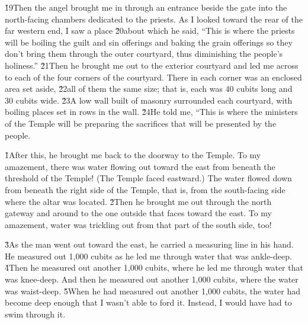\v{19}Then the angel brought me in through an entrance beside the gate into the north-facing chambers dedicated to the priests. As I looked toward the rear of the far western end, I saw a place \v{20}about which he said, ``This is where the priests will be boiling the guilt and sin offerings and baking the grain offerings so they don't bring them through the outer courtyard, thus diminishing the people's holiness.'' \v{21}Then he brought me out to the exterior courtyard and led me across to each of the four corners of the courtyard. There in each corner was an enclosed area set aside, \v{22}all of them the same size; that is, each was 40 cubits long and 30 cubits wide. \v{23}A low wall built of masonry surrounded each courtyard, with boiling places set in rows in the wall. \v{24}He told me, ``This is where the ministers of the Temple will be preparing the sacrifices that will be presented by the people.

\v{1}After this, he brought me back to the doorway to the Temple. To my amazement, there was water flowing out toward the east from beneath the threshold of the Temple! (The Temple faced eastward.) The water flowed down from beneath the right side of the Temple, that is, from the south-facing side where the altar was located. \v{2}Then he brought me out through the north gateway and around to the one outside that faces toward the east. To my amazement, water was trickling out from that part of the south side, too!

\v{3}As the man went out toward the east, he carried a measuring line in his hand. He measured out 1,000 cubits as he led me through water that was ankle-deep. \v{4}Then he measured out another 1,000 cubits, where he led me through water that was knee-deep. And then he measured out another 1,000 cubits, where the water was waist-deep. \v{5}When he had measured out another 1,000 cubits, the water had become deep enough that I wasn't able to ford it. Instead, I would have had to swim through it.


